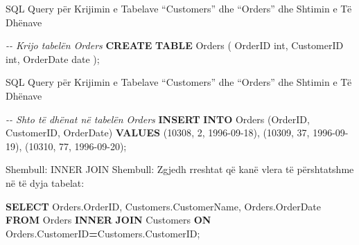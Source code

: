 \documentclass[
  ignorenonframetext,
]{beamer}
\newenvironment{Shaded}{\begin{snugshade}}{\end{snugshade}}
\newcommand{\CommentTok}[1]{\textcolor[rgb]{0.56,0.35,0.01}{\textit{#1}}}
\newcommand{\DataTypeTok}[1]{\textcolor[rgb]{0.13,0.29,0.53}{#1}}
\newcommand{\DecValTok}[1]{\textcolor[rgb]{0.00,0.00,0.81}{#1}}
\newcommand{\KeywordTok}[1]{\textcolor[rgb]{0.13,0.29,0.53}{\textbf{#1}}}
\newcommand{\NormalTok}[1]{#1}
\newcommand{\OperatorTok}[1]{\textcolor[rgb]{0.81,0.36,0.00}{\textbf{#1}}}
\newcommand{\StringTok}[1]{\textcolor[rgb]{0.31,0.60,0.02}{#1}}
\begin{document}
\begin{frame}[fragile]{SQL Query për Krijimin e Tabelave ``Customers''
dhe ``Orders'' dhe Shtimin e Të Dhënave}
\label{sql-query-puxebr-krijimin-e-tabelave-customers-dhe-orders-dhe-shtimin-e-tuxeb-dhuxebnave-2}

\begin{Shaded}
\begin{Highlighting}[]

\CommentTok{{-}{-} Krijo tabelën Orders}
\KeywordTok{CREATE} \KeywordTok{TABLE}\NormalTok{ Orders (}
\NormalTok{    OrderID }\DataTypeTok{int}\NormalTok{,}
\NormalTok{    CustomerID }\DataTypeTok{int}\NormalTok{,}
\NormalTok{    OrderDate }\DataTypeTok{date}
\NormalTok{);}
\end{Highlighting}
\end{Shaded}
\end{frame}

\begin{frame}[fragile]{SQL Query për Krijimin e Tabelave ``Customers''
dhe ``Orders'' dhe Shtimin e Të Dhënave}
\label{sql-query-puxebr-krijimin-e-tabelave-customers-dhe-orders-dhe-shtimin-e-tuxeb-dhuxebnave-3}

\begin{Shaded}
\begin{Highlighting}[]
\CommentTok{{-}{-} Shto të dhënat në tabelën Orders}
\KeywordTok{INSERT} \KeywordTok{INTO}\NormalTok{ Orders (OrderID, CustomerID, OrderDate) }\KeywordTok{VALUES}
\NormalTok{(}\DecValTok{10308}\NormalTok{, }\DecValTok{2}\NormalTok{, }\StringTok{\textquotesingle{}1996{-}09{-}18\textquotesingle{}}\NormalTok{),}
\NormalTok{(}\DecValTok{10309}\NormalTok{, }\DecValTok{37}\NormalTok{, }\StringTok{\textquotesingle{}1996{-}09{-}19\textquotesingle{}}\NormalTok{),}
\NormalTok{(}\DecValTok{10310}\NormalTok{, }\DecValTok{77}\NormalTok{, }\StringTok{\textquotesingle{}1996{-}09{-}20\textquotesingle{}}\NormalTok{);}
\end{Highlighting}
\end{Shaded}
\end{frame}

\begin{frame}[fragile]{Shembull: INNER JOIN}
\label{shembull-inner-join}
Shembull: Zgjedh rreshtat që kanë vlera të përshtatshme në të dyja
tabelat:


\begin{Shaded}
\begin{Highlighting}[]

\KeywordTok{SELECT}\NormalTok{ Orders.OrderID, Customers.CustomerName, Orders.OrderDate}
\KeywordTok{FROM}\NormalTok{ Orders}
\KeywordTok{INNER} \KeywordTok{JOIN}\NormalTok{ Customers }\KeywordTok{ON}\NormalTok{ Orders.CustomerID}\OperatorTok{=}\NormalTok{Customers.CustomerID;}
\end{Highlighting}
\end{Shaded}
\end{frame}
\end{document}

